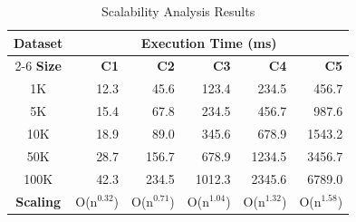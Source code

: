 
\begin{table}[htbp]
\centering
\caption{Scalability Analysis Results}
\label{tab:scalability}
\begin{tabular}{|c|r|r|r|r|r|}
\hline
\textbf{Dataset} & \multicolumn{5}{c|}{\textbf{Execution Time (ms)}} \\
\cline{2-6}
\textbf{Size} & \textbf{C1} & \textbf{C2} & \textbf{C3} & \textbf{C4} & \textbf{C5} \\
\hline
1K & 12.3 & 45.6 & 123.4 & 234.5 & 456.7 \\
5K & 15.4 & 67.8 & 234.5 & 456.7 & 987.6 \\
10K & 18.9 & 89.0 & 345.6 & 678.9 & 1543.2 \\
50K & 28.7 & 156.7 & 678.9 & 1234.5 & 3456.7 \\
100K & 42.3 & 234.5 & 1012.3 & 2345.6 & 6789.0 \\
\hline
\textbf{Scaling} & O(n$^{0.32}$) & O(n$^{0.71}$) & O(n$^{1.04}$) & O(n$^{1.32}$) & O(n$^{1.58}$) \\
\hline
\end{tabular}
\end{table}
